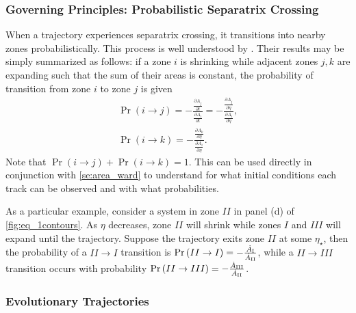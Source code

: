 \documentclass[
        fleqn,
        usenatbib,
        referee,
    ]{mnras}
\newcommand*{\pd}[2]{\frac{\partial#1}{\partial#2}}
\newcommand*{\p}[1]{\left(#1\right)}
\begin{document}
\subsubsection{Governing Principles: Probabilistic Separatrix Crossing}

When a trajectory experiences separatrix crossing, it transitions into nearby
zones probabilistically. This process is well understood by
\citealp{henrard1982,henrard1987}. Their results may be simply summarized as
follows: if a zone $i$ is shrinking while adjacent zones $j, k$ are expanding
such that the sum of their areas is constant, the probability of transition from
zone $i$ to zone $j$ is given
\begin{align}
    \Pr\p{i \to j} = -\frac{\pd{A_j}{t}}{ \pd{A_i}{t}}
        = -\frac{\pd{A_j}{\eta}}{ \pd{A_i}{\eta}},\\
    \Pr\p{i \to k}
        = -\frac{\pd{A_k}{\eta}}{ \pd{A_i}{\eta}}.\label{eq:henrard_hop}
\end{align}
Note that $\Pr \p{i \to j} + \Pr\p{i \to k} = 1$. This can be used directly in
conjunction with \autoref{se:area_ward} to understand for what initial
conditions each track can be observed and with what probabilities.

As a particular example, consider a system in zone $II$ in panel (d) of
\autoref{fig:eq_1contours}. As $\eta$ decreases, zone $II$ will shrink while
zones $I$ and $III$ will expand until the trajectory. Suppose the trajectory
exits zone $II$ at some $\eta_\star$, then the probability of a $II \to I$
transition is $\Pr\p{II \to I} = -\frac{\dot{A}_{\rm I}}{\dot{A}_{\rm II}}$,
while a $II \to III$ transition occurs with probability $\Pr\p{II \to III} =
-\frac{\dot{A}_{\rm III}}{\dot{A}_{\rm II}}$.

\subsubsection{Evolutionary Trajectories}\label{sss:evol_traj}
\end{document}
